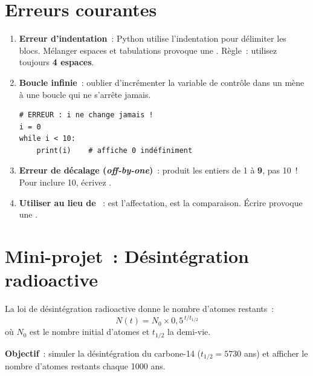 \section{Erreurs courantes}

\begin{errmark}
\begin{enumerate}
    \item \textbf{Erreur d'indentation}~: Python utilise l'indentation pour d\'elimiter
    les blocs. M\'elanger espaces et tabulations provoque une .
    R\`egle~: utilisez toujours \textbf{4 espaces}.

    \item \textbf{Boucle infinie}~: oublier d'incr\'ementer la variable de contr\^ole
    dans un  m\`ene \`a une boucle qui ne s'arr\^ete jamais.
    \begin{verbatim}
# ERREUR : i ne change jamais !
i = 0
while i < 10:
    print(i)    # affiche 0 indéfiniment
    \end{verbatim}

    \item \textbf{Erreur de d\'ecalage (\emph{off-by-one})}~:  produit
    les entiers de 1 \`a \textbf{9}, pas 10~! Pour inclure 10, \'ecrivez .

    \item \textbf{Utiliser \py{=} au lieu de \py{==}}~: \py{=} est l'affectation,
    \py{==} est la comparaison. \'Ecrire  provoque une .
\end{enumerate}
\end{errmark}

\section{Mini-projet~: D\'esint\'egration radioactive}

\begin{projet}
La loi de d\'esint\'egration radioactive donne le nombre
d'atomes restants~:
\[
    N(t) = N_0 \times 0{,}5^{\,t / t_{1/2}}
\]
o\`u $N_0$ est le nombre initial d'atomes et $t_{1/2}$ la demi-vie.

\textbf{Objectif}~: simuler la d\'esint\'egration du carbone-14 ($t_{1/2} = 5730$ ans)
et afficher le nombre d'atomes restants chaque 1000 ans.
\end{projet}

